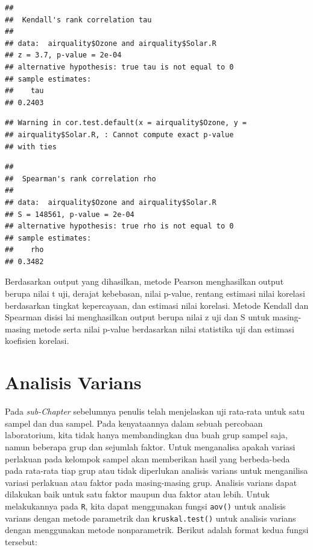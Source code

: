 \documentclass[
]{book}
\newenvironment{Shaded}{\begin{snugshade}}{\end{snugshade}}
\newcommand{\AttributeTok}[1]{\textcolor[rgb]{0.13,0.29,0.53}{#1}}
\newcommand{\CommentTok}[1]{\textcolor[rgb]{0.56,0.35,0.01}{\textit{#1}}}
\newcommand{\FunctionTok}[1]{\textcolor[rgb]{0.13,0.29,0.53}{\textbf{#1}}}
\newcommand{\NormalTok}[1]{#1}
\newcommand{\SpecialCharTok}[1]{\textcolor[rgb]{0.81,0.36,0.00}{\textbf{#1}}}
\newcommand{\StringTok}[1]{\textcolor[rgb]{0.31,0.60,0.02}{#1}}
\theoremstyle{definition}
\theoremstyle{definition}
\theoremstyle{definition}
\theoremstyle{definition}
\theoremstyle{remark}
\begin{document}
\begin{verbatim}
## 
##  Kendall's rank correlation tau
## 
## data:  airquality$Ozone and airquality$Solar.R
## z = 3.7, p-value = 2e-04
## alternative hypothesis: true tau is not equal to 0
## sample estimates:
##    tau 
## 0.2403
\end{verbatim}

\begin{Shaded}
\end{Shaded}

\begin{verbatim}
## Warning in cor.test.default(x = airquality$Ozone, y =
## airquality$Solar.R, : Cannot compute exact p-value
## with ties
\end{verbatim}

\begin{verbatim}
## 
##  Spearman's rank correlation rho
## 
## data:  airquality$Ozone and airquality$Solar.R
## S = 148561, p-value = 2e-04
## alternative hypothesis: true rho is not equal to 0
## sample estimates:
##    rho 
## 0.3482
\end{verbatim}

Berdasarkan output yang dihasilkan, metode Pearson menghasilkan output berupa nilai t uji, derajat kebebasan, nilai p-value, rentang estimasi nilai korelasi berdasarkan tingkat kepercayaan, dan estimasi nilai korelasi. Metode Kendall dan Spearman disisi lai menghasilkan output berupa nilai z uji dan S untuk masing-masing metode serta nilai p-value berdasarkan nilai statistika uji dan estimasi koefisien korelasi.

\hypertarget{analisis-varians}{%
\section{Analisis Varians}\label{analisis-varians}}

Pada \emph{sub-Chapter} sebelumnya penulis telah menjelaskan uji rata-rata untuk satu sampel dan dua sampel. Pada kenyataannya dalam sebuah percobaan laboratorium, kita tidak hanya membandingkan dua buah grup sampel saja, namun beberapa grup dan sejumlah faktor. Untuk menganalisa apakah variasi perlakuan pada kelompok sampel akan memberikan hasil yang berbeda-beda pada rata-rata tiap grup atau tidak diperlukan analisis varians untuk menganilisa variasi perlakuan atau faktor pada masing-masing grup. Analisis varians dapat dilakukan baik untuk satu faktor maupun dua faktor atau lebih. Untuk melakukannya pada \texttt{R}, kita dapat menggunakan fungsi \texttt{aov()} untuk analisis varians dengan metode parametrik dan \texttt{kruskal.test()} untuk analisis varians dengan menggunakan metode nonparametrik. Berikut adalah format kedua fungsi tersebut:
\end{document}

